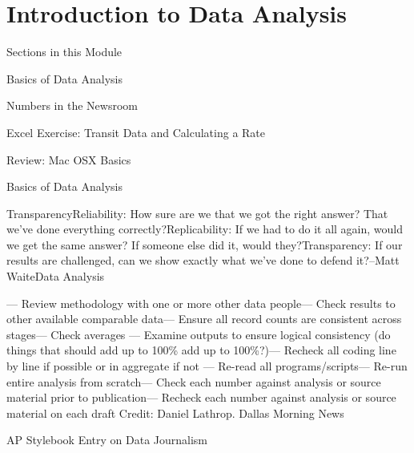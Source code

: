 \documentclass[]{book}
\begin{document}
\hypertarget{introduction-to-data-analysis-1}{%
\chapter{Introduction to Data Analysis}\label{introduction-to-data-analysis-1}}

Sections in this Module

Basics of Data Analysis

Numbers in the Newsroom

Excel Exercise: Transit Data and Calculating a Rate

Review: Mac OSX Basics

Basics of Data Analysis

TransparencyReliability: How sure are we that we got the right answer? That we've done everything correctly?Replicability: If we had to do it all again, would we get the same answer? If someone else did it, would they?Transparency: If our results are challenged, can we show exactly what we've done to defend it?--Matt WaiteData Analysis

--- Review methodology with one or more other data people--- Check results to other available comparable data--- Ensure all record counts are consistent across stages--- Check averages --- Examine outputs to ensure logical consistency (do things that should add up to 100\% add up to 100\%?)--- Recheck all coding line by line if possible or in aggregate if not --- Re-read all programs/scripts--- Re-run entire analysis from scratch--- Check each number against analysis or source material prior to publication--- Recheck each number against analysis or source material on each draft Credit: Daniel Lathrop. Dallas Morning News

AP Stylebook Entry on Data Journalism
\end{document}
